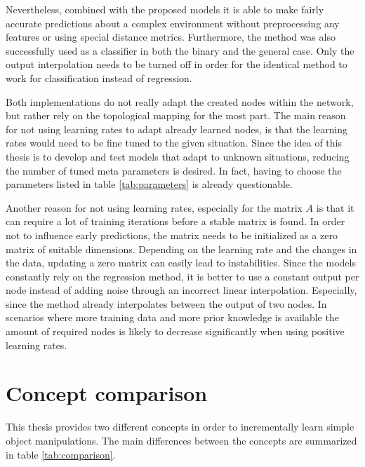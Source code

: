 Nevertheless, combined with the proposed models it is able to make fairly accurate predictions about a complex environment without preprocessing any features or using special distance metrics. Furthermore, the method was also successfully used as a classifier in both the binary and the general case. Only the output interpolation needs to be turned off in order for the identical method to work for classification instead of regression. 

Both implementations do not really adapt the created nodes within the network, but rather rely on the topological mapping for the most part. The main reason for not using learning rates to adapt already learned nodes, is that the learning rates would need to be fine tuned to the given situation. Since the idea of this thesis is to develop and test models that adapt to unknown situations, reducing the number of tuned meta parameters is desired. In fact, having to choose the parameters listed in table \ref{tab:parameters} is already questionable.

Another reason for not using learning rates, especially for the matrix $A$ is that it can require a lot of training iterations before a stable matrix is found. In order not to influence early predictions, the matrix needs to be initialized as a zero matrix of suitable dimensions. Depending on the learning rate and the changes in the data, updating a zero matrix can easily lead to instabilities.
Since the models constantly rely on the regression method, it is better to use a constant output per node instead of adding noise through an incorrect linear interpolation. Especially, since the method already interpolates between the output of two nodes.
In scenarios where more training data and more prior knowledge is available the amount of required nodes is likely to decrease significantly when using positive learning rates.

\section{Concept comparison}

This thesis provides two different concepts in order to incrementally learn simple object manipulations. The main differences between the concepts are summarized in table \ref{tab:comparison}.

